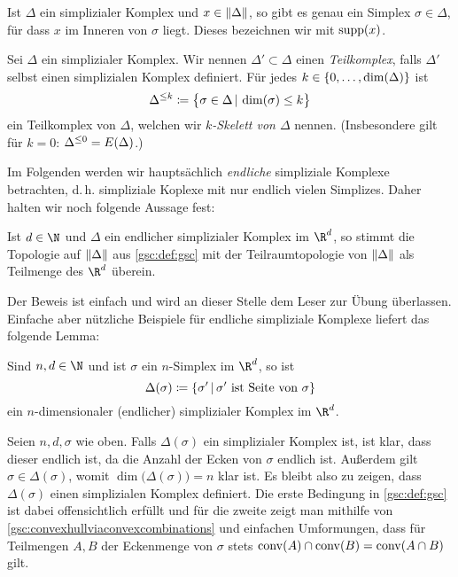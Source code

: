 \begin{thDef}[Träger]
    Ist $\Delta$ ein simplizialer Komplex und $x\in\lVert\Delta\rVert$, so gibt es
    genau ein Simplex $\sigma\in\Delta$, für dass $x$ im Inneren von $\sigma$
    liegt. Dieses bezeichnen wir mit $\operatorname{supp}(x)$.
\end{thDef}

\begin{thDef}
    Sei $\Delta$ ein simplizialer Komplex. Wir nennen $\Delta'\subset\Delta$
    einen \emph{Teilkomplex}, falls $\Delta'$ selbst einen simplizialen Komplex
    definiert.
    Für jedes $k\in\{0,\ldots,\dim(\Delta)\}$ ist
    \[ \skeleton\Delta{k} 
        \defeq \bigl\{ \sigma\in\Delta \Mid \dim(\sigma)\leq k \bigr\}
    \]
    ein Teilkomplex von $\Delta$, welchen wir \emph{$k$-Skelett von $\Delta$}
    nennen. (Insbesondere gilt für $k=0$: $\Delta^{\leq0} = E(\Delta)$.)
\end{thDef}

\bigskip
Im Folgenden werden wir hauptsächlich \emph{endliche} simpliziale Komplexe
betrachten, d.\,h. simpliziale Koplexe mit nur endlich vielen Simplizes. Daher
halten wir noch folgende Aussage fest:

\begin{thLemma}
    Ist $d\in\N$ und $\Delta$ ein endlicher simplizialer Komplex im $\R^d$, 
    so stimmt die Topologie auf $\lVert\Delta\rVert$ aus \cref{gsc:def:gsc} mit 
    der Teilraumtopologie von $\lVert\Delta\rVert$ als Teilmenge des $\R^d$
    überein.
\end{thLemma}

Der Beweis ist einfach und wird an dieser Stelle dem Leser zur Übung überlassen.
Einfache aber nützliche Beispiele für endliche simpliziale Komplexe liefert das
folgende Lemma:

\begin{thLemma}
    \label{gsc:complexofsimplex}
    Sind $n,d\in\N$ und ist $\sigma$ ein $n$-Simplex im $\R^d$, so ist
    \[ \Delta(\sigma) 
        \defeq \{ \sigma' \Mid \sigma' \text{ ist Seite von } \sigma \}
    \]
    ein $n$-dimensionaler (endlicher) simplizialer Komplex im $\R^d$.
\end{thLemma}

\begin{proofsketch}
    Seien $n,d,\sigma$ wie oben. Falls $\Delta(\sigma)$ ein simplizialer Komplex
    ist, ist klar, dass dieser endlich ist, da die Anzahl der Ecken von $\sigma$
    endlich ist. Außerdem gilt $\sigma\in\Delta(\sigma)$, womit
    $\dim\bigl(\Delta(\sigma)\bigr) = n$ klar ist. Es bleibt also zu zeigen,
    dass $\Delta(\sigma)$ einen simplizialen Komplex definiert. Die erste
    Bedingung in \cref{gsc:def:gsc} ist dabei offensichtlich erfüllt und für die
    zweite zeigt man mithilfe von \cref{gsc:convexhullviaconvexcombinations} 
    und einfachen Umformungen, dass für Teilmengen $A,B$ der
    Eckenmenge von $\sigma$ stets $\operatorname{conv}(A)\cap\operatorname{conv}(B) = \operatorname{conv}(A\cap B)$ gilt.
    \\
\end{proofsketch}

